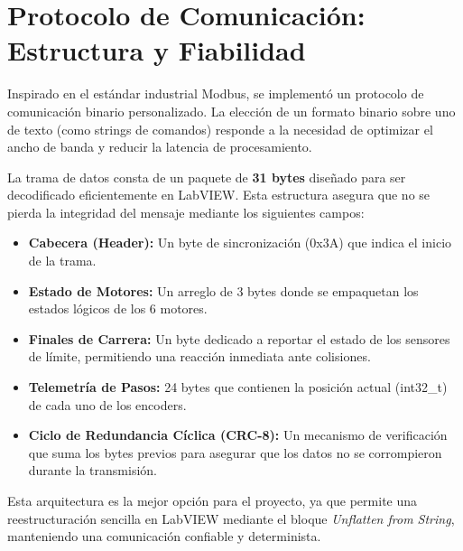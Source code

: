 \section{Protocolo de Comunicación: Estructura y Fiabilidad}
Inspirado en el estándar industrial Modbus, se implementó un protocolo de comunicación binario personalizado. La elección de un formato binario sobre uno de texto (como strings de comandos) responde a la necesidad de optimizar el ancho de banda y reducir la latencia de procesamiento.



La trama de datos consta de un paquete de \textbf{31 bytes} diseñado para ser decodificado eficientemente en LabVIEW. Esta estructura asegura que no se pierda la integridad del mensaje mediante los siguientes campos:

\begin{itemize}
	\item \textbf{Cabecera (Header):} Un byte de sincronización (0x3A) que indica el inicio de la trama.
	\item \textbf{Estado de Motores:} Un arreglo de 3 bytes donde se empaquetan los estados lógicos de los 6 motores.
	\item \textbf{Finales de Carrera:} Un byte dedicado a reportar el estado de los sensores de límite, permitiendo una reacción inmediata ante colisiones.
	\item \textbf{Telemetría de Pasos:} 24 bytes que contienen la posición actual (int32\_t) de cada uno de los encoders.
	\item \textbf{Ciclo de Redundancia Cíclica (CRC-8):} Un mecanismo de verificación que suma los bytes previos para asegurar que los datos no se corrompieron durante la transmisión.
\end{itemize}

Esta arquitectura es la mejor opción para el proyecto, ya que permite una reestructuración sencilla en LabVIEW mediante el bloque \textit{Unflatten from String}, manteniendo una comunicación confiable y determinista.


